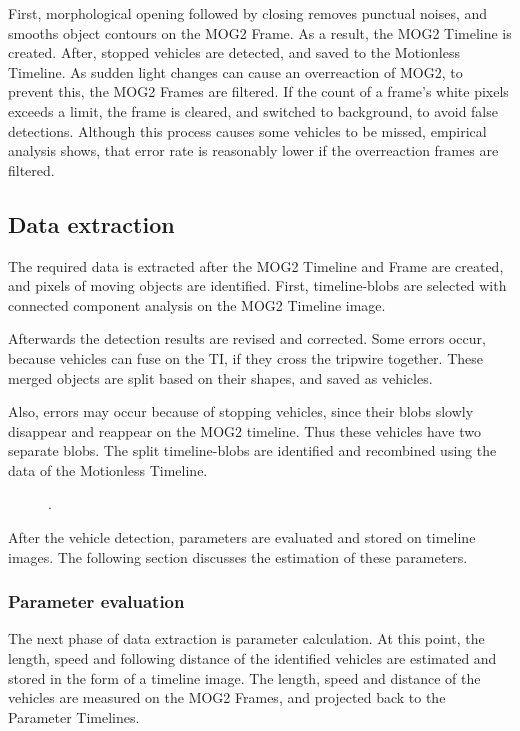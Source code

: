 First, morphological opening followed by closing removes punctual noises, and smooths object contours on the MOG2 Frame.
As a result, the MOG2 Timeline is created.
After, stopped vehicles are detected, and saved to the Motionless Timeline.
As sudden light changes can cause an overreaction of MOG2, to prevent this, the MOG2 Frames are filtered.
If the count of a frame's white pixels exceeds a limit, the frame is cleared, and switched to background, to avoid false detections.
Although this process causes some vehicles to be missed, empirical analysis shows, that error rate is reasonably lower if the overreaction frames are filtered.
\subsection{Data extraction}
The required data is extracted after the MOG2 Timeline and Frame are created, and pixels of moving objects are identified.
First, timeline-blobs are selected with connected component analysis on the MOG2 Timeline image.

Afterwards the detection results are revised and corrected.
Some errors occur, because vehicles can fuse on the TI, if they cross the tripwire together. These merged objects are split based on their shapes, and saved as vehicles.

Also, errors may occur because of stopping vehicles, since their blobs slowly disappear and reappear on the MOG2 timeline.
Thus these vehicles have two separate blobs.
The split timeline-blobs are identified and recombined using the data of the Motionless Timeline. 

\begin{figure}[p]
	\centering
	
	\caption{.\label{fig:size_speed_following_distance}}
\end{figure}

After the vehicle detection, parameters are evaluated and stored on timeline images.
The following section discusses the estimation of these parameters.

\subsubsection{Parameter evaluation}\label{chap:parameter_evaluation}
The next phase of data extraction is parameter calculation.
At this point, the length, speed and following distance of the identified vehicles are estimated and stored in the form of a timeline image.
The length, speed and distance of the vehicles are measured on the MOG2 Frames, and projected back to the Parameter Timelines.

